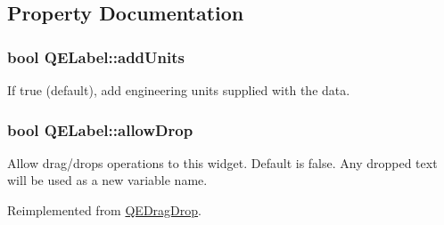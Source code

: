 \subsection{Property Documentation}
\hypertarget{classQELabel_a5f23f1e7bf3363bb5227b0ee77815165}{
\subsubsection[{addUnits}]{\setlength{\rightskip}{0pt plus 5cm}bool QELabel::addUnits}}
\label{classQELabel_a5f23f1e7bf3363bb5227b0ee77815165}
If true (default), add engineering units supplied with the data. \hypertarget{classQELabel_ac0b536527dad1f83436417721add3032}{
\subsubsection[{allowDrop}]{\setlength{\rightskip}{0pt plus 5cm}bool QELabel::allowDrop}}
\label{classQELabel_ac0b536527dad1f83436417721add3032}
Allow drag/drops operations to this widget. Default is false. Any dropped text will be used as a new variable name. 

Reimplemented from \hyperlink{classQEDragDrop}{QEDragDrop}.

